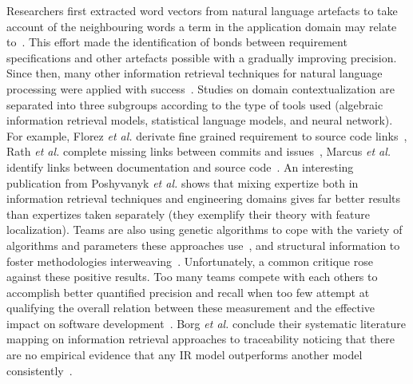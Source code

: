 Researchers first extracted word vectors from natural language artefacts to take account of the neighbouring words a term in the application domain may relate to~\cite{delucia2012-information-retrieval-for-traceability}. This effort made the identification of bonds between requirement specifications and other artefacts possible with a gradually improving precision. Since then, many other information retrieval techniques for natural language processing were applied with success~\cite{arunthavanathan2016-traceability-with-NLP}. Studies on domain contextualization are separated into three subgroups according to the type of tools used (algebraic information retrieval models, statistical language models, and neural network).  For example, Florez \textit{et al.} derivate fine grained requirement to source code links~\cite{florez2019-finegrained-req2code}, Rath \textit{et al.} complete missing links between commits and issues~\cite{rath2018-guo-augmenting-incomplete-traces}, Marcus \textit{et al.} identify links between documentation and source code~\cite{marcus2003-latent-semantic-indexing-for-traceability-LSI}. An interesting publication from Poshyvanyk \textit{et al.} shows that mixing expertize both in information retrieval techniques and engineering domains gives far better results than expertizes taken separately (they exemplify their theory with feature localization). 
Teams are also using genetic algorithms to cope with the variety of algorithms and parameters these approaches use~\cite{marcen2020-req2model-with-EA-ranking-train-system,panichella2013-genetic-programming-for-effective-topic-modeling}, and structural information to foster methodologies interweaving~\cite{panichella2013-using-structural-information-to-improve-IR-traceability}. Unfortunately, a common critique rose against these positive results. Too many teams compete with each others to accomplish better quantified precision and recall when too few attempt at qualifying the overall relation between these measurement and the effective impact on software development~\cite{clelandhuang2014-traceability-trends-and-futurte-direction,shin2015-guidelines-benchmark-auto-traceability}. 
Borg \textit{et al.} conclude their systematic literature mapping on information retrieval approaches to traceability noticing that there are no empirical evidence that any IR model outperforms another model consistently~\cite{borg2014-SmS-IR-for-traceability}. 

